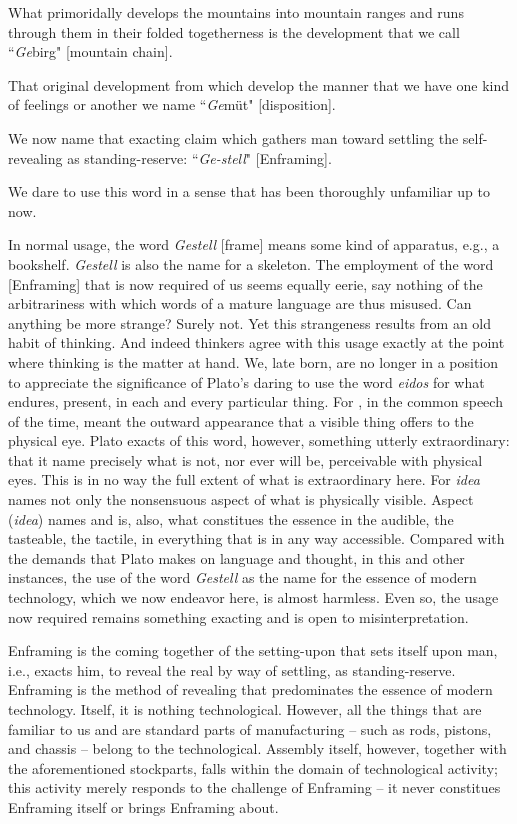 What primoridally develops the mountains into mountain ranges and runs through them in their folded togetherness is the development that we call ``\textit{Ge}birg" [mountain chain].

That original development from which develop the manner that we have one kind of feelings or another we name ``\textit{Ge}m\"{u}t" [disposition].

We now name that exacting claim which gathers man toward settling the self-revealing as standing-reserve: ``\textit{Ge-stell}" [Enframing].

We dare to use this word in a sense that has been thoroughly unfamiliar up to now.

In normal usage, the word \textit{Gestell} [frame] means some kind of apparatus, e.g., a bookshelf. \textit{Gestell} is also the name for a skeleton. The employment of the word  [Enframing] that is now required of us seems equally eerie, say nothing of the arbitrariness with which words of a mature language are thus misused. Can anything be more strange? Surely not. Yet this strangeness results from an old habit of thinking. And indeed thinkers agree with this usage exactly at the point where thinking is the matter at hand.  We, late born, are no longer in a position to appreciate the significance of Plato's daring to use the word \textit{eidos} for what endures, present, in each and every particular thing. For , in the common speech of the time, meant the outward appearance that a visible thing offers to the physical eye. Plato exacts of this word, however, something utterly extraordinary: that it name precisely what is not, nor ever will be, perceivable with physical eyes. This is in no way the full extent of what is extraordinary here. For \textit{idea} names not only the nonsensuous aspect of what is physically visible. Aspect (\textit{idea}) names and is, also, what constitues the essence in the audible, the tasteable, the tactile, in everything that is in any way accessible. Compared with the demands that Plato makes on language and thought, in this and other instances, the use of the word \textit{Gestell} as the name for the essence of modern technology, which we now endeavor here, is almost harmless. Even so, the usage now required remains something exacting and is open to misinterpretation.

Enframing is the coming together of the setting-upon that sets itself upon man, i.e., exacts him, to reveal the real by way of settling, as standing-reserve. Enframing is the method of revealing that predominates the essence of modern technology. Itself, it is nothing technological. However, all the things that are familiar to us and are standard parts of manufacturing -- such as rods, pistons, and chassis -- belong to the technological. Assembly itself, however, together with the aforementioned stockparts, falls within the domain of technological activity; this activity merely responds to the challenge of Enframing -- it never constitues Enframing itself or brings Enframing about.

